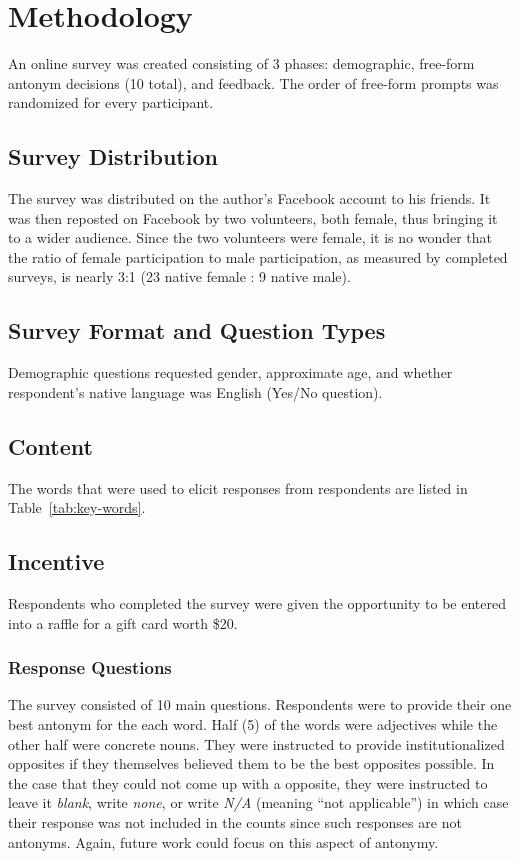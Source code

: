 \section {Methodology}
An online survey was created consisting of 3 phases: demographic, free-form antonym decisions (10 total), and feedback.  The order of free-form prompts was randomized for every participant.  %

\subsection{Survey Distribution} The survey was distributed on the author’s Facebook account to his friends.  It was then reposted on Facebook by two volunteers, both female, thus bringing it to a wider audience.  Since the two volunteers were female, it is no wonder that the ratio of female participation to male participation, as measured by completed surveys, is nearly 3:1 (23 native female : 9 native male).  

\subsection{Survey Format and Question Types} Demographic questions requested gender, approximate age, and whether respondent’s native language was English (Yes/No question).  


\subsection{Content} 
The words that were used to elicit responses from respondents are listed in Table~\ref{tab:key-words}.

\subsection{Incentive}
Respondents who completed the survey were given the opportunity to be entered into a raffle for a gift card worth \$20.

\subsubsection{Response Questions}
The survey consisted of 10 main questions.  Respondents were to provide their one best antonym for the each word. Half (5) of the words were adjectives while the other half were concrete nouns.  They were instructed to provide institutionalized opposites if they themselves believed them to be the best opposites possible. In the case that they could not come up with a opposite, they were instructed to leave it \textit{blank}, write \textit{none}, or write \textit{N/A} (meaning ``not applicable'') in which case their response was not included in the counts since such responses are not antonyms.  Again, future work could focus on this aspect of antonymy.  

